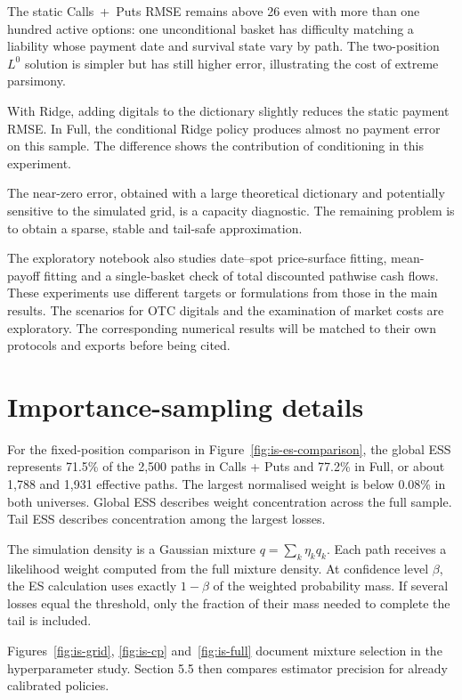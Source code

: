 \documentclass[12pt,a4paper]{article}
\newcommand{\1}{\mathbf{1}}
\begin{document}
The static Calls~+~Puts RMSE remains above 26 even with more than one hundred
active options: one unconditional basket has difficulty matching a liability whose
payment date and survival state vary by path. The two-position $L^0$ solution
is simpler but has still higher error, illustrating the cost of extreme
parsimony.

With Ridge, adding digitals to the dictionary slightly reduces the static payment RMSE. In Full, the conditional Ridge policy produces almost no payment error on this sample. The difference shows the contribution of conditioning in this experiment.

The near-zero error, obtained with a large theoretical dictionary and potentially
sensitive to the simulated grid, is a capacity diagnostic. The remaining problem
is to obtain a sparse, stable and tail-safe approximation.

The exploratory notebook also studies date--spot price-surface fitting, mean-payoff fitting and a single-basket check of total discounted pathwise cash flows. These experiments use different targets or formulations from those in the main results. The scenarios for OTC digitals and the examination of market costs are exploratory. The corresponding numerical results will be matched to their own protocols and exports before being cited.



\section{Importance-sampling details}\label{app:is}

For the fixed-position comparison in Figure~\ref{fig:is-es-comparison}, the global ESS represents 71.5\% of the 2,500 paths in Calls + Puts and 77.2\% in Full, or about 1,788 and 1,931 effective paths. The largest normalised weight is below 0.08\% in both universes. Global ESS describes weight concentration across the full sample. Tail ESS describes concentration among the largest losses.

The simulation density is a Gaussian mixture $q=\sum_k\eta_kq_k$. Each path receives a likelihood weight computed from the full mixture density. At confidence level $\beta$, the ES calculation uses exactly $1-\beta$ of the weighted probability mass. If several losses equal the threshold, only the fraction of their mass needed to complete the tail is included.

Figures~\ref{fig:is-grid}, \ref{fig:is-cp} and~\ref{fig:is-full} document mixture selection in the hyperparameter study. Section 5.5 then compares estimator precision for already calibrated policies.
\end{document}
